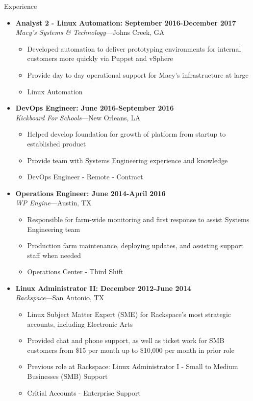 \documentclass[10pt,oneside]{article}
\newenvironment{ressection}[1]{
    \vspace{4pt}
    {\fontfamily{phv}\selectfont\Large#1}
    \begin{itemize}
    \vspace{3pt}
}{
    \end{itemize}
}
\newcommand{\ressubitem}[1]{
    \vspace{-1pt}
    \item \begin{flushleft} #1 \end{flushleft}
}
\newcommand{\resbigitem}[3]{
    \vspace{-5pt}
    \item
    \textbf{#3} \\
    \textit{#1}---#2
}
\newenvironment{ressubsec}[3]{
    \resbigitem{#1}{#2}{#3}
    \vspace{-2pt}
    \begin{itemize}
}{
    \end{itemize}
}
\begin{document}
\begin{ressection}{Experience}
    \begin{ressubsec}{Macy's Systems \& Technology}{Johns Creek, GA}{Analyst 2 - Linux Automation: September 2016-December 2017}
        \ressubitem{Developed automation to deliver prototyping environments for internal customers more quickly via Puppet and vSphere}
        \ressubitem{Provide day to day operational support for Macy's infrastructure at large}
        \ressubitem{Linux Automation}
    \end{ressubsec}

    \begin{ressubsec}{Kickboard For Schools}{New Orleans, LA}{DevOps Engineer: June 2016-September 2016}
        \ressubitem{Helped develop foundation for growth of platform from startup to established product}
        \ressubitem{Provide team with Systems Engineering experience and knowledge}
        \ressubitem{DevOps Engineer - Remote - Contract}
    \end{ressubsec}

    \pagebreak

    \begin{ressubsec}{WP Engine}{Austin, TX}{Operations Engineer: June 2014-April 2016}
        \ressubitem{Responsible for farm-wide monitoring and first response to assist Systems Engineering team}
        \ressubitem{Production farm maintenance, deploying updates, and assisting support staff when needed}
        \ressubitem{Operations Center - Third Shift}
    \end{ressubsec}

    \begin{ressubsec}{Rackspace}{San Antonio, TX}{Linux Administrator II: December 2012-June 2014}
        \ressubitem{Linux Subject Matter Expert (SME) for Rackspace's most strategic accounts, including Electronic Arts}
        \ressubitem{Provided chat and phone support, as well as ticket work for SMB customers from \$15 per month up to \$10,000 per month in prior role}
        \ressubitem{Previous role at Rackspace: Linux Administrator I - Small to Medium Businesses (SMB) Support}
        \ressubitem{Critial Accounts - Enterprise Support}
    \end{ressubsec}

\end{ressection}
\end{document}
